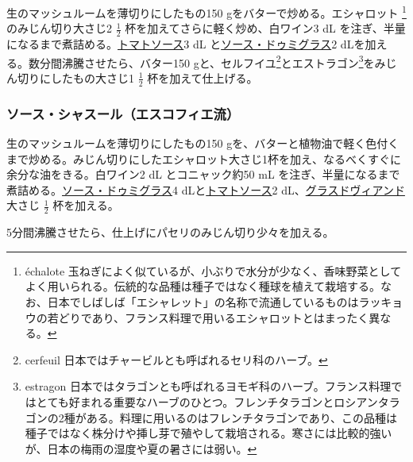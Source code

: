 \begin{recette}
生のマッシュルームを薄切りにしたもの150 gをバターで炒める。エシャロット
\footnote{échalote
  玉ねぎによく似ているが、小ぶりで水分が少なく、香味野菜としてよく用いられる。伝統的な品種は種子ではなく種球を植えて栽培する。なお、日本でしばしば「エシャレット」の名称で流通しているものはラッキョウの若どりであり、フランス料理で用いるエシャロットとはまったく異なる。}のみじん切り大さじ2
\(\frac{1}{2}\) 杯を加えてさらに軽く炒め、白ワイン3 dL
を注ぎ、半量になるまで煮詰める。\protect\hyperlink{sauce-tomate}{トマトソース}3
dL と\protect\hyperlink{sauce-demi-glace}{ソース・ドゥミグラス}2
dLを加える。数分間沸騰させたら、バター150 gと、セルフイユ\footnote{cerfeuil
  日本ではチャービルとも呼ばれるセリ科のハーブ。}とエストラゴン\footnote{estragon
  日本ではタラゴンとも呼ばれるヨモギ科のハーブ。フランス料理ではとても好まれる重要なハーブのひとつ。フレンチタラゴンとロシアンタラゴンの2種がある。料理に用いるのはフレンチタラゴンであり、この品種は種子ではなく株分けや挿し芽で殖やして栽培される。寒さには比較的強いが、日本の梅雨の湿度や夏の暑さには弱い。}をみじん切りにしたもの大さじ1
\(\frac{1}{2}\) 杯を加えて仕上げる。

\hypertarget{sauce-chasseur-procede-escoffier}{%
\subsubsection{ソース・シャスール（エスコフィエ流）}\label{sauce-chasseur-procede-escoffier}}



生のマッシュルームを薄切りにしたもの150
gを、バターと植物油で軽く色付くまで炒める。みじん切りにしたエシャロット大さじ1杯を加え、なるべくすぐに余分な油をきる。白ワイン2
dL とコニャック約50 mL
を注ぎ、半量になるまで煮詰める。\protect\hyperlink{sauce-demi-glace}{ソース・ドゥミグラス}4
dLと\protect\hyperlink{sauce-tomate}{トマトソース}2
dL、\protect\hyperlink{glace-de-viande}{グラスドヴィアンド}大さじ
\(\frac{1}{2}\) 杯を加える。

5分間沸騰させたら、仕上げにパセリのみじん切り少々を加える。

\hypertarget{sauce-chaud-froid-brune}{%
}
\end{recette}
